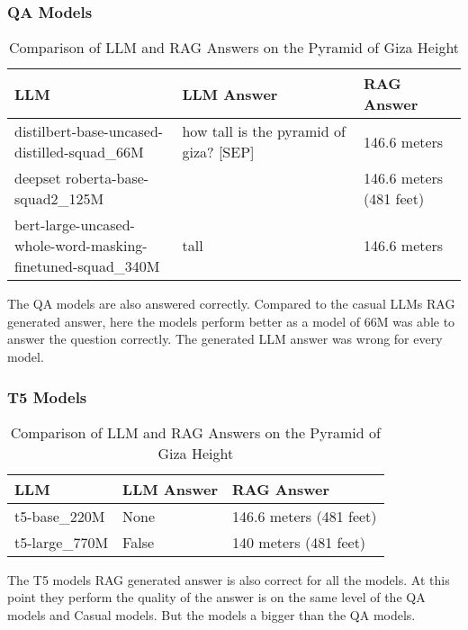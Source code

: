\documentclass{wseas}
\begin{document}

\subsubsection{QA Models}


\begin{table*}[htbp]
\centering
\begin{tabular}{|p{0.37\linewidth}|p{0.40\linewidth}|p{0.23\linewidth}|}
\hline
\textbf{LLM} & \textbf{LLM Answer} & \textbf{RAG Answer} \\ \hline
distilbert-base-uncased-distilled-squad\_66M & how tall is the pyramid of giza? {[}SEP{]} & 146.6 meters \\ \hline
deepset roberta-base-squad2\_125M &  & 146.6 meters (481 feet) \\ \hline
bert-large-uncased-whole-word-masking-finetuned-squad\_340M & tall & 146.6 meters \\ \hline
\end{tabular}
\caption{Comparison of LLM and RAG Answers on the Pyramid of Giza Height}
\end{table*}

The QA models are also answered correctly. Compared to the casual LLMs
RAG generated answer, here the models perform better as a model of 66M
was able to answer the question correctly. The generated LLM answer was
wrong for every model.

\subsubsection{T5 Models}

\begin{table*}[htbp]
\centering
\begin{tabular}{|l|l|l|}
\hline
\textbf{LLM} & \textbf{LLM Answer} & \textbf{RAG Answer} \\ \hline
t5-base\_220M & None & 146.6 meters (481 feet) \\ \hline
t5-large\_770M & False & 140 meters (481 feet) \\ \hline
\end{tabular}
\caption{Comparison of LLM and RAG Answers on the Pyramid of Giza Height}
\end{table*}

The T5 models RAG generated answer is also correct for all the models.
At this point they perform the quality of the answer is on the same
level of the QA models and Casual models. But the models a bigger than
the QA models.
\end{document}

